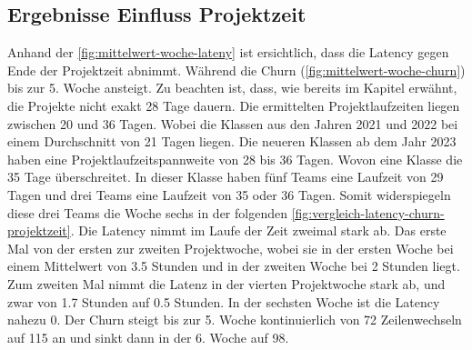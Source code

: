 \subsection{Ergebnisse Einfluss Projektzeit}
Anhand der \autoref{fig:mittelwert-woche-lateny} ist ersichtlich, dass die Latency gegen Ende der Projektzeit abnimmt. Während die Churn (\autoref{fig:mittelwert-woche-churn}) bis zur 5. Woche ansteigt. 
Zu beachten ist, dass, wie bereits im Kapitel  erwähnt, die Projekte nicht exakt 28 Tage dauern. Die ermittelten Projektlaufzeiten liegen zwischen 20 und 36 Tagen.
Wobei die Klassen aus den Jahren 2021 und 2022 bei einem Durchschnitt von 21 Tagen liegen. Die neueren Klassen ab dem Jahr 2023 haben eine Projektlaufzeitspannweite von 28 bis 36 Tagen. Wovon eine Klasse die 35 Tage überschreitet. In dieser Klasse haben fünf Teams eine Laufzeit von 29 Tagen und drei Teams eine Laufzeit von 35 oder 36 Tagen. Somit widerspiegeln diese drei Teams die Woche sechs in der folgenden \autoref{fig:vergleich-latency-churn-projektzeit}. Die Latency nimmt im Laufe der Zeit zweimal stark ab. Das erste Mal von der ersten zur zweiten Projektwoche, wobei sie in der ersten Woche bei einem Mittelwert von 3.5 Stunden und in der zweiten Woche bei 2 Stunden liegt. Zum zweiten Mal nimmt die Latenz in der vierten Projektwoche stark ab, und zwar von 1.7 Stunden auf 0.5 Stunden. In der sechsten Woche ist die Latency nahezu 0. Der Churn steigt bis zur 5. Woche kontinuierlich von 72 Zeilenwechseln auf 115 an und sinkt dann in der 6. Woche auf 98.
